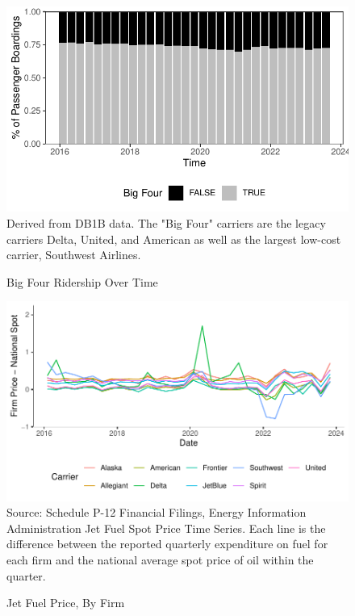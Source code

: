 \documentclass{article}
\begin{document}
\begin{appendices}
	\begin{figure}[h]
		\caption{Big Four Ridership Over Time}
		\label{fig:BigFour_Ridership}
		\includegraphics{BigFour_Ridership_Graph.pdf}
		\footnotesize{Derived from DB1B data. The "Big Four" carriers are the legacy carriers Delta, United, and American as well as the largest low-cost carrier, Southwest Airlines.}
	\end{figure}

\begin{figure}
	\caption{Jet Fuel Price, By Firm}
	\label{fig:JetFuel}
	\includegraphics[width = \linewidth]{Fuel_Price_Compare}
	\footnotesize{Source: Schedule P-12 Financial Filings, Energy Information Administration Jet Fuel Spot Price Time Series. Each line is the difference between the reported quarterly expenditure on fuel for each firm and the national average spot price of oil within the quarter.}
\end{figure}


\end{appendices}
\end{document}
